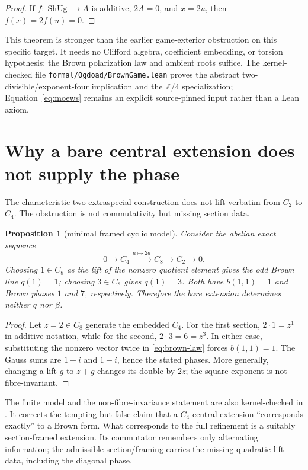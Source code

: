 \documentclass[11pt]{article}
\newtheorem{proposition}[theorem]{Proposition}
\theoremstyle{definition}
\theoremstyle{remark}
\newcommand{\Z}{\mathbb Z}
\newcommand{\ShUg}{\operatorname{ShUg}}
\begin{document}
\begin{proof}
If $f:\ShUg\to A$ is additive, $2A=0$, and $x=2u$, then
$f(x)=2f(u)=0$.
\end{proof}

This theorem is stronger than the earlier game-exterior obstruction on this
specific target.  It needs no Clifford algebra, coefficient embedding, or
torsion hypothesis: the Brown polarization law and ambient roots suffice.
The kernel-checked file \texttt{formal/Ogdoad/BrownGame.lean} proves the
abstract two-divisible/exponent-four implication and the $\Z/4$
specialization; Equation~\eqref{eq:moews} remains an explicit source-pinned
input rather than a Lean axiom.

\section{Why a bare central extension does not supply the phase}

The characteristic-two extraspecial construction does not lift verbatim from
$C_2$ to $C_4$.  The obstruction is not commutativity but missing section
data.

\begin{proposition}[minimal framed cyclic model]\label{prop:c8}
Consider the abelian exact sequence
\[
 0\longrightarrow C_4\xrightarrow{\,a\mapsto2a\,}C_8
 \longrightarrow C_2\longrightarrow0.
\]
Choosing $1\in C_8$ as the lift of the nonzero quotient element gives the odd
Brown line $q(1)=1$; choosing $3\in C_8$ gives $q(1)=3$.  Both have
$b(1,1)=1$ and Brown phases $1$ and $7$, respectively.  Therefore the bare
extension determines neither $q$ nor $\beta$.
\end{proposition}

\begin{proof}
Let $z=2\in C_8$ generate the embedded $C_4$.  For the first section,
$2\cdot1=z^1$ in additive notation, while for the second,
$2\cdot3=6=z^3$.  In either case, substituting the nonzero vector twice in
\eqref{eq:brown-law} forces $b(1,1)=1$.  The Gauss sums are $1+i$ and
$1-i$, hence the stated phases.  More generally, changing a lift $g$ to
$z+g$ changes its double by $2z$; the square exponent is not fibre-invariant.
\end{proof}

The finite model and the non-fibre-invariance statement are also
kernel-checked in .  It corrects the tempting but false
claim that a $C_4$-central extension ``corresponds exactly'' to a Brown form.
What corresponds to the full refinement is a suitably section-framed
extension.  Its commutator remembers only alternating information; the
admissible section/framing carries the missing quadratic lift data, including
the diagonal phase.
\end{document}
